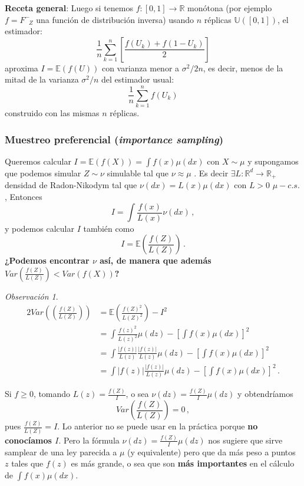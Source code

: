 \documentclass[letterpaper,11pt]{article} %
\theoremstyle{defbreak}
\theoremstyle{propbreak}
\theoremstyle{remark}
\newtheorem{remark}{Observación}[subsection]
\theoremstyle{break}
\def\R{\mathbb{R}}
\def\E{\mathbb{E}}
\def\unif{\mathbb{U}([0,1])}
\def\var{Var}
\begin{document}
\textbf{Receta general}: Luego si tenemos $f:[0,1]\to\R$ monótona (por ejemplo $f=F^-_{\mbox{ }Z}$ una función de distribución inversa) usando $n$ réplicas $\unif$, el estimador: $$\displaystyle\frac{1}{n}\sum^n_{k=1}[\frac{f(U_k)+f(1-U_k)}{2}]$$ aproxima $I=\E(f(U))$ con varianza menor a $\sigma^2/2n$, es decir, menos de la mitad de la varianza $\sigma^2/n$ del estimador usual: $$\displaystyle\frac{1}{n}\sum^n_{k=1}f(U_k)$$ construido con las mismas $n$ réplicas.

\subsubsection{Muestreo preferencial (\textit{importance sampling})}
\label{preferencial}
Queremos calcular $I=\E(f(X))=\int f(x)\mu(dx)$ con $X\sim \mu$ y supongamos que podemos simular $Z\sim\nu$ simulable tal que $\nu\approx\mu$ .  %
Es decir $\exists L:\R^d\to\R_+$ densidad de Radon-Nikodym tal que $\nu(dx)=L(x)\mu(dx)$ con $L>0$ $\mu-c.s.$,
\newline Entonces 
$$I=\displaystyle\int\frac{f(x)}{L(x)}\nu(dx)\, ,$$ 
y podemos calcular $I$ también como 
$$I=\displaystyle\E\left(\frac{f(Z)}{L(Z)}\right) \, .$$
\textbf{¿Podemos encontrar $\nu$ así, de manera que además $\var(\frac{f(Z)}{L(Z)})<\var(f(X))$?}
\begin{remark}
\begin{alignat*}{2}
    \var\left(\displaystyle\left(\frac{f(Z)}{L(Z)}\right)\right) & = \E\left(\frac{f(Z)^2}{L(Z)^2}\right)-I^2\\
     & = \int \frac{f(z)^2}{L(z)^2}\mu(dz) - [\int f(x)\mu(dx)]^2 \\
     & = \int \frac{|f(z)|}{L(z)}\frac{|f(z)|}{L(z)}\mu(dz) - [\int f(x)\mu(dx)]^2 \\
     & = \int |f(z)|\frac{|f(z)|}{L(z)}\mu(dz) - [\int f(x)\mu(dx)]^2 \, .
\end{alignat*}
\end{remark}
Si $f\geq0$, tomando $L(z)=\displaystyle\frac{f(Z)}{I}$, o sea $\nu(dz)=\displaystyle\frac{f(Z)}{I}\mu(dz)$ y obtendríamos 
$$\var\left(\frac{f(Z)}{L(Z)}\right)=0 \, ,$$
pues $\frac{f(Z)}{L(Z)}=I$.
\newp Lo anterior no se puede usar en la práctica porque \textbf{no conocíamos $I$}. Pero la fórmula $\nu(dz)=\frac{f(Z)}{I}\mu(dz)$ nos sugiere que sirve samplear de una ley parecida a $\mu$ (y equivalente) pero que da más peso a puntos $z$ tales que $f(z)$ es más grande, o sea que son \textbf{más importantes} en el cálculo de $\int f(x)\mu(dx)$.
\end{document}
